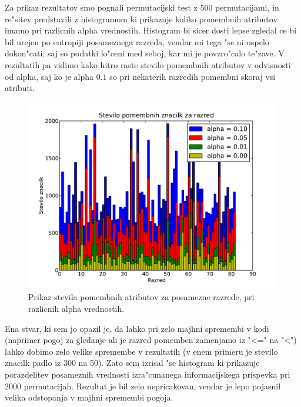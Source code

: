 \documentclass[a4paper,11pt]{article}
\begin{document}
Za prikaz rezultatov smo pognali permutacijski test z 500 permutacijami, in re"sitev predstavili z histogramom ki prikazuje koliko pomembnih atributov imamo pri razlicnih alpha vrednostih. Histogram bi sicer dosti lepse zgledal ce bi bil urejen po entropiji posameznega razreda, vendar mi tega "se ni uspelo dokon"cati, saj so podatki lo"ceni med seboj, kar mi je povzro"calo te"zave. V rezultatih pa vidimo kako hitro raste stevilo pomembnih atributov v odvisnosti od alpha, saj ko je alpha $0.1$ so pri nekaterih razredih pomembni skoraj vsi atributi. 
\begin{figure}[H]
\begin{center}
\includegraphics[scale=0.6]{muraw.pdf}
\caption{Prikaz stevila pomembnih atributov za posamezne razrede, pri razlicnih alpha vrednostih.}
\label{slika1}
\end{center}
\end{figure}

Ena stvar, ki sem jo opazil je, da lahko pri zelo majhni spremembi v kodi (naprimer pogoj za gledanje ali je razred pomemben zamenjamo iz "<=" na "<") lahko dobimo zelo velike spremembe v rezultatih (v enem primeru je stevilo znacilk padlo iz 300 na 50). Zato sem izrisal "se histogram ki prikazuje porazdelitev posameznih vrednosti izra"cunanega informacijskega prispevka pri 2000 permutacijah. Rezultat je bil zelo nepricakovan, vendar je lepo pojasnil velika odstopanja v majhni spremembi pogoja.
\end{document}
